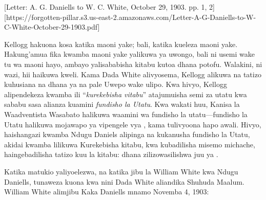 
[Letter: A. G. Daniells to W. C. White, October 29, 1903. pp. 1, 2][https://forgotten-pillar.s3.us-east-2.amazonaws.com/Letter-A-G-Daniells-to-W-C-White-October-29-1903.pdf]

Kellogg hakuona kosa katika maoni yake; bali, katika kueleza maoni yake. Hakung'amua fika kwamba maoni yake yalikuwa ya uwongo, bali ni usemi wake tu wa maoni hayo, ambayo yalisababisha kitabu kutoa dhana potofu. Walakini, ni wazi, hii haikuwa kweli. Kama Dada White alivyosema, Kellogg alikuwa na tatizo kuhusiana na dhana ya  na pale Uwepo wake ulipo. Kwa hivyo, Kellogg alipendekeza kwamba ili “\textit{kurekebisha vitabu}” atajumuisha semi za utatu kwa sababu sasa alianza kuamini \textit{fundisho la Utatu}. Kwa wakati huu, Kanisa la Waadventista Wasabato halikuwa waamini wa fundisho la utatu—fundisho la Utatu halikuwa mojawapo ya vipengele vya , kama tulivyoona hapo awali. Hivyo, haishangazi kwamba Ndugu Daniels alipinga na kukanusha fundisho la Utatu, akidai kwamba lilikuwa Kurekebisha kitabu, kwa kubadilisha misemo michache, haingebadilisha tatizo kuu la kitabu: dhana zilizowasilishwa juu ya .

Katika matukio yaliyoelezwa, na katika jibu la William White kwa Ndugu Daniells, tunaweza kuona kwa nini Dada White aliandika Shuhuda Maalum. William White alimjibu Kaka Daniells mnamo Novemba 4, 1903:





